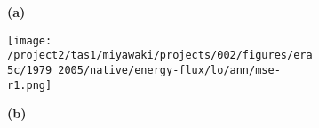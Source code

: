 \documentclass[preview]{standalone}
\begin{document}
\begin{figure}
  \begin{subfigure}[t]{0.04\textwidth}
    \textbf{\large{(a)}}
  \end{subfigure}
  \begin{subfigure}[t]{0.96\textwidth}
    \texttt{[image: /project2/tas1/miyawaki/projects/002/figures/era5c/1979\_2005/native/energy-flux/lo/ann/mse-r1.png]}
  \end{subfigure}

  \begin{subfigure}[t]{0.04\textwidth}
    \textbf{\large{(b)}}
  \end{subfigure}

\end{figure}
\end{document}
